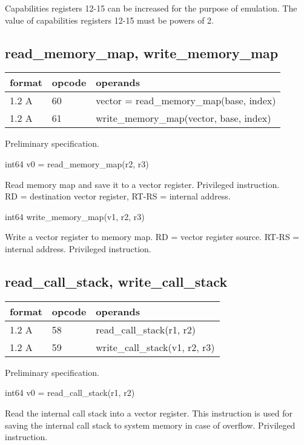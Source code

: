 \documentclass[forwardcom.tex]{subfiles}
\begin{document}
Capabilities registers 12-15 can be increased for the purpose of emulation. The value of capabilities registers 12-15 must be powers of 2.
\vv


\subsection{read\_memory\_map, write\_memory\_map}
\label{table:readMemoryMapInstruction}
\begin{tabular}{|p{12mm}|p{15mm}|p{100mm}|}
\hline
\bfseries format & \bfseries opcode & \bfseries operands \\ \hline
1.2 A & 60 & vector = read\_memory\_map(base, index) \\ \hline
1.2 A & 61 & write\_memory\_map(vector, base, index) \\ \hline
\end{tabular}
\vv

Preliminary specification.
\vv

int64 v0 = read\_memory\_map(r2, r3)
\vv

Read memory map and save it to a vector register. Privileged instruction.\\
RD = destination vector register, RT-RS = internal address.
\vv

int64 write\_memory\_map(v1, r2, r3)
\vv

Write a vector register to memory map. RD = vector register source. RT-RS = internal address. Privileged instruction.
\vv


\subsection{read\_call\_stack, write\_call\_stack}
\label{table:readCallStackInstruction}
\begin{tabular}{|p{12mm}|p{15mm}|p{100mm}|}
\hline
\bfseries format & \bfseries opcode & \bfseries operands \\ \hline
1.2 A & 58 & read\_call\_stack(r1, r2) \\
\hline
1.2 A & 59 & write\_call\_stack(v1, r2, r3) \\ \hline
\end{tabular}
\vv

Preliminary specification.
\vv

int64 v0 = read\_call\_stack(r1, r2)
\vv

Read the internal call stack into a vector register. This instruction is used for saving the internal call stack to system memory in case of overflow.
Privileged instruction.
\vv
\end{document}
